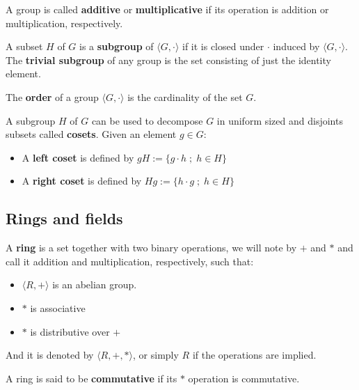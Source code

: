 \documentclass[a4paper,12pt]{article}
\begin{document}
\noindent
A group is called \textbf{additive} or \textbf{multiplicative} if its
operation is addition or multiplication, respectively.

\begin{definition}
  A subset $H$ of $G$ is a \textbf{subgroup} of $\langle G,\cdot \rangle$ if it is
  closed under $\cdot$ induced by $\langle G,\cdot \rangle$. The \textbf{trivial subgroup} of any
  group is the set consisting of just the identity element.
\end{definition}

\begin{definition}
  The \textbf{order} of a group $\langle G,\cdot\rangle$ is the cardinality of the set $G$.
\end{definition}

\begin{definition}
  A subgroup $H$ of $G$ can be used to decompose $G$ in uniform sized and
  disjoints subsets called \textbf{cosets}. Given an element $g \in G$:
  \begin{itemize}
  \item A \textbf{left coset} is defined by $gH := \{g\cdot h \; ; \; h \in H\}$
  \item A \textbf{right coset} is defined by $Hg := \{h\cdot g \; ; \; h \in H\}$
  \end{itemize}
\end{definition}

\subsection{Rings and fields}
\label{sec:org3d40107}

   \begin{definition}
  A \textbf{ring} is a set together with two binary operations, we will note by
  $+$ and $*$ and call it addition and multiplication, respectively, such that:
  \begin{itemize}
  \item $\langle R,+\rangle$ is an abelian group.
  \item $*$ is associative
  \item $*$ is distributive over $+$
  \end{itemize}

  And it is denoted by $\langle R,+,*\rangle$, or simply $R$ if the operations are implied.
\end{definition}

\begin{definition}
  A ring is said to be \textbf{commutative} if its $*$ operation is commutative.
\end{definition}
\end{document}
